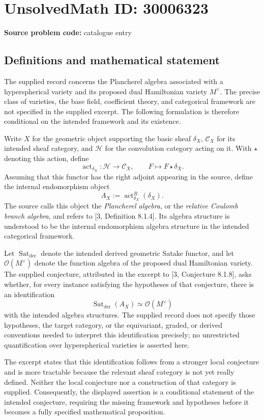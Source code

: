 \documentclass[11pt]{article}
\begin{document}
\section*{UnsolvedMath ID: 30006323}
\textbf{Source problem code:} catalogue entry
\subsection{Definitions and mathematical statement}
The supplied record concerns the Plancherel algebra associated with a hyperspherical variety and its proposed dual Hamiltonian variety \(M^\vee\). The precise class of varieties, the base field, coefficient theory, and categorical framework are not specified in the supplied excerpt. The following formulation is therefore conditional on the intended framework and its existence.

Write \(X\) for the geometric object supporting the basic sheaf \(\delta_X\), \(\mathcal C_X\) for its intended sheaf category, and \(\mathcal H\) for the convolution category acting on it. With \(\star\) denoting this action, define
\[
\operatorname{act}_{\delta_X}\colon\mathcal H\longrightarrow\mathcal C_X,
\qquad F\longmapsto F\star\delta_X.
\]
Assuming that this functor has the right adjoint appearing in the source, define the internal endomorphism object
\[
A_X:=\operatorname{act}_{\delta_X}^{R}(\delta_X).
\]
The source calls this object the \emph{Plancherel algebra}, or the \emph{relative Coulomb branch algebra}, and refers to [3, Definition 8.1.4]. Its algebra structure is understood to be the internal endomorphism algebra structure in the intended categorical framework.

Let \(\operatorname{Sat}_{\mathrm{der}}\) denote the intended derived geometric Satake functor, and let \(\mathcal O(M^\vee)\) denote the function algebra of the proposed dual Hamiltonian variety. The supplied conjecture, attributed in the excerpt to [3, Conjecture 8.1.8], asks whether, for every instance satisfying the hypotheses of that conjecture, there is an identification
\[
\operatorname{Sat}_{\mathrm{der}}(A_X)
\simeq \mathcal O(M^\vee)
\]
with the intended algebra structures. The supplied record does not specify those hypotheses, the target category, or the equivariant, graded, or derived conventions needed to interpret this identification precisely; no unrestricted quantification over hyperspherical varieties is asserted here.

The excerpt states that this identification follows from a stronger local conjecture and is more tractable because the relevant sheaf category is not yet really defined. Neither the local conjecture nor a construction of that category is supplied. Consequently, the displayed assertion is a conditional statement of the intended conjecture, requiring the missing framework and hypotheses before it becomes a fully specified mathematical proposition.
\end{document}

